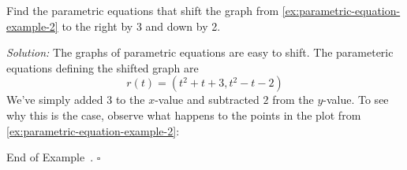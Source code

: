 \documentclass[10pt]{article}
\theoremstyle{definition}
\newtheorem{example}[theorem]{Example}
\renewenvironment{example}
{\begin{oldexample}}
  {\par\smallskip\hfill   End of Example~\theexample. $\square$    \par\end{oldexample}}
\newcommand{\1}[1]{\textbf{1}_{\left[#1\right]}} %
\begin{document}
\begin{example}
  Find the parametric equations that shift the graph from \cref{ex:parametric-equation-example-2} to the right by 3 and
  down by 2.

  \textit{Solution:} The graphs of parametric equations are easy to shift. The parameteric equations defining the
  shifted graph are
  \begin{equation*}
    r(t) = (t^{2}+t+3, t^{2}-t -2)
  \end{equation*}
  We've simply added 3 to the $x$-value and subtracted $2$ from the $y$-value. To see why this is the case, observe what
  happens to the points in the plot from \cref{ex:parametric-equation-example-2}:
  \begin{center}
\end{center}
\end{example}
\end{document}
